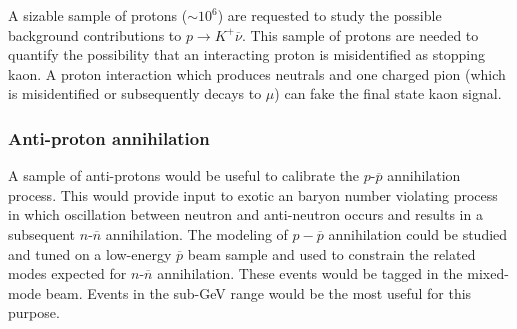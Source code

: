 A sizable sample of protons ($\sim 10^6$)
are requested to study the possible background contributions to  $p \rightarrow K^+ \overline{\nu}$.
This sample of  protons are needed to quantify the possibility that an interacting proton 
is  misidentified as stopping kaon. A proton interaction which produces neutrals and one charged pion 
(which is misidentified or subsequently decays to $\mu$) can fake the final state kaon signal.


\subsubsection{Anti-proton annihilation }

A sample of anti-protons would be useful to calibrate the $p$-$\overline{p}$ annihilation process. 
This would provide input to exotic an baryon number violating process in which oscillation between neutron and anti-neutron occurs and results in a
subsequent  $n$-$\overline{n}$ annihilation. The modeling of $p-\overline{p}$ annihilation could be
studied and tuned on a low-energy $\overline{p}$ beam sample and used to constrain the related modes 
expected for  $n$-$\overline{n}$ annihilation. These events would be tagged in the 
mixed-mode beam. Events in the sub-GeV range would be the most useful for this purpose.




